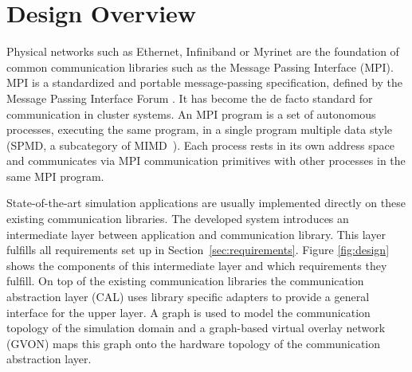 \section{Design Overview}

Physical networks such as Ethernet, Infiniband or Myrinet are the
foundation of common communication libraries such as the Message
Passing Interface (MPI).  MPI is a standardized and portable
message-passing specification, defined by the Message Passing
Interface Forum \cite{ref:mpi_specification}. It has become the de
facto standard for communication in cluster systems.  An MPI program
is a set of autonomous processes, executing the same program, in a
single program multiple data style (SPMD, a subcategory of
MIMD~\cite{Flynn:1972:COE:1952456.1952459}). Each process rests in its
own address space and communicates via MPI communication primitives
with other processes in the same MPI program.

State-of-the-art simulation applications are
usually implemented directly on these existing communication
libraries. The developed system introduces an intermediate layer
between application and communication library. This layer fulfills all
requirements set up in Section~\ref{sec:requirements}. Figure
\ref{fig:design} shows the components of this intermediate layer and
which requirements they fulfill.  On top of the existing communication
libraries the communication abstraction layer (CAL) uses library
specific adapters to provide a general interface for the upper layer.  A
graph is used to model the communication topology of the simulation
domain and a graph-based virtual overlay network (GVON) maps this graph onto
the hardware topology of the communication abstraction layer.

